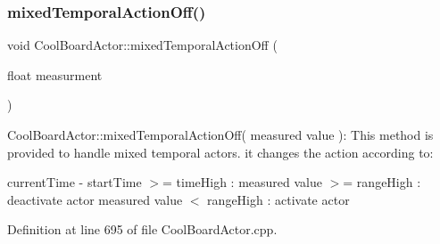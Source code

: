 \subsubsection{\texorpdfstring{mixed\+Temporal\+Action\+Off()}{mixedTemporalActionOff()}}
{\footnotesize\ttfamily void Cool\+Board\+Actor\+::mixed\+Temporal\+Action\+Off (\begin{DoxyParamCaption}\item[{float}]{measurment }\end{DoxyParamCaption})}

Cool\+Board\+Actor\+::mixed\+Temporal\+Action\+Off( measured value )\+: This method is provided to handle mixed temporal actors. it changes the action according to\+:

current\+Time -\/ start\+Time $>$= time\+High \+: measured value $>$= range\+High \+: deactivate actor measured value $<$ range\+High \+: activate actor 

Definition at line 695 of file Cool\+Board\+Actor.\+cpp.


